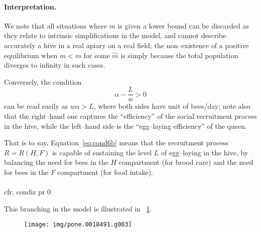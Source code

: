 \paragraph{Interpretation.}
\label{par:interpretationCond6b}
We note that all situations where $m$ is given a lower bound can be discarded as they relate to intrinsic simplifications in the model, and cannot describe accurately a hive in a real apiary on a real field; the non--existence of a positive equilibrium when $m< \hat{m}$ for some $\hat{m}$ is simply because the total population diverges to infinity in such cases.

Conversely, the condition
\begin{equation}
\alpha - \frac{L}{w} > 0
    \label{eq:cond6b}
\end{equation}
can be read easily as $w \alpha >L$, where both sides have unit of bees/day; note also that the right--hand one captures the ``efficiency'' of the social recruitment process in the hive, while the left--hand side is the ``egg--laying efficiency'' of the queen.

That is to say, Equation~\eqref{eq:cond6b} means that the recruitment process $R= R(H, F)$ is capable of sustaining the level $L$ of egg--laying in the hive, by balancing the need for bees in the $H$ compartment (for brood care) and the need for bees in the $F$ compartment (for food intake).

\paragraph{} %
cfr. condiz pr 0




\pagebreak %
%
%

This branching in the model is illustrated in \figurename~\ref{img:kh11phasePlane}.

\begin{figure}[pbh]
    \centering
    \texttt{[image: img/pone.0018491.g003]}

    \caption[\figurename~3 from \parencite{khoury2011}]{
    }
    \label{img:kh11phasePlane}
\end{figure}

